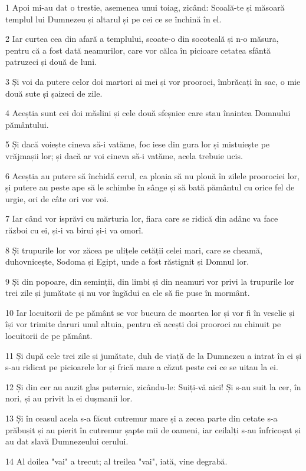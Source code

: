 \par 1 Apoi mi-au dat o trestie, asemenea unui toiag, zicând: Scoală-te și măsoară templul lui Dumnezeu și altarul și pe cei ce se închină în el.
\par 2 Iar curtea cea din afară a templului, scoate-o din socoteală și n-o măsura, pentru că a fost dată neamurilor, care vor călca în picioare cetatea sfântă patruzeci și două de luni.
\par 3 Și voi da putere celor doi martori ai mei și vor prooroci, îmbrăcați în sac, o mie două sute și șaizeci de zile.
\par 4 Aceștia sunt cei doi măslini și cele două sfeșnice care stau înaintea Domnului pământului.
\par 5 Și dacă voiește cineva să-i vatăme, foc iese din gura lor și mistuiește pe vrăjmașii lor; și dacă ar voi cineva să-i vatăme, acela trebuie ucis.
\par 6 Aceștia au putere să închidă cerul, ca ploaia să nu plouă în zilele proorociei lor, și putere au peste ape să le schimbe în sânge și să bată pământul cu orice fel de urgie, ori de câte ori vor voi.
\par 7 Iar când vor isprăvi cu mărturia lor, fiara care se ridică din adânc va face război cu ei, și-i va birui și-i va omorî.
\par 8 Și trupurile lor vor zăcea pe ulițele cetății celei mari, care se cheamă, duhovnicește, Sodoma și Egipt, unde a fost răstignit și Domnul lor.
\par 9 Și din popoare, din seminții, din limbi și din neamuri vor privi la trupurile lor trei zile și jumătate și nu vor îngădui ca ele să fie puse în mormânt.
\par 10 Iar locuitorii de pe pământ se vor bucura de moartea lor și vor fi în veselie și își vor trimite daruri unul altuia, pentru că acești doi prooroci au chinuit pe locuitorii de pe pământ.
\par 11 Și după cele trei zile și jumătate, duh de viață de la Dumnezeu a intrat în ei și s-au ridicat pe picioarele lor și frică mare a căzut peste cei ce se uitau la ei.
\par 12 Și din cer au auzit glas puternic, zicându-le: Suiți-vă aici! Și s-au suit la cer, în nori, și au privit la ei dușmanii lor.
\par 13 Și în ceasul acela s-a făcut cutremur mare și a zecea parte din cetate s-a prăbușit și au pierit în cutremur șapte mii de oameni, iar ceilalți s-au înfricoșat și au dat slavă Dumnezeului cerului.
\par 14 Al doilea "vai" a trecut; al treilea "vai", iată, vine degrabă.
